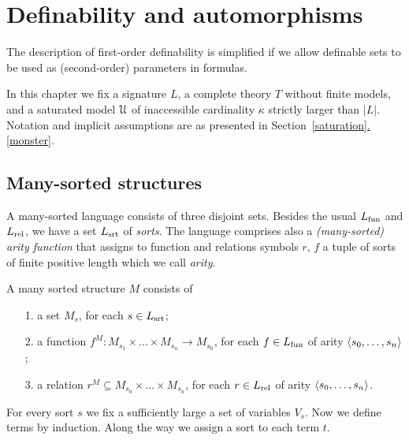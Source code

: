\documentclass[creche.tex]{subfiles}
\begin{document}
\chapter{Definability and automorphisms}
\label{imaginary}

\def\ceq#1#2#3{\parbox{15ex}{$\displaystyle #1$}\parbox{6ex}{\hfil$\displaystyle #2$}$\displaystyle  #3$}

\def\medrel#1{\parbox[t]{6ex}{$\displaystyle\hfil #1$}}
\def\ceq#1#2#3{\parbox[t]{25ex}{$\displaystyle #1$}\medrel{#2}{$\displaystyle #3$}}


\def\b{b\llap{\raisebox{-.8ex}{-\hskip.2ex}}}
\def\a{a\llap{\raisebox{-.8ex}{-\hskip.2ex}}}
\def\d{{\rm def}}

The description of first-order definability is simplified if we allow definable sets to be used as (second-order) parameters in formulas.

In this chapter we fix a signature $L$, a complete theory $T$ without finite models, and a saturated model $\EuScript U$ of inaccessible cardinality $\kappa$ strictly larger than $|L|$. Notation and implicit assumptions are as presented in Section~\hyperref[saturation]{\ref*{saturation}.\ref*{monster}}.

\section{Many-sorted structures}
\label{many-sorted}
\def\Ar{{\rm Ar}}

A many-sorted language consists of three disjoint sets. Besides the usual $L_{\rm fun}$ and $L_{\rm rel}$, we have a set $L_{\rm srt}$ of \emph{sorts}. The language comprises also a \emph{(many-sorted) arity function} that assigns to function and relations symbols $r$, $f$ a tuple of sorts of finite positive length which we call \emph{arity}.

A many sorted structure $M$ consists of
\begin{itemize}
\item[1.] a set $M_s$, for each $s\in L_{\rm srt}$;
\item[2.] a function $f^M:M_{s_1}\times\dots\times M_{s_n}\to M_{s_0}$, for each $f\in L_{\rm fun}$ of arity $\langle s_0,\dots,s_n\rangle$;
\item[3.] a relation $r^M\subseteq M_{s_0}\times\dots\times M_{s_n}$, for each $r\in L_{\rm rel}$ of arity $\langle s_0,\dots,s_n\rangle$.
\end{itemize}

For every sort $s$ we fix a sufficiently large a set of variables $V_s$. Now we define terms by induction. Along the way we assign a sort to each term $t$. 
\end{document}
